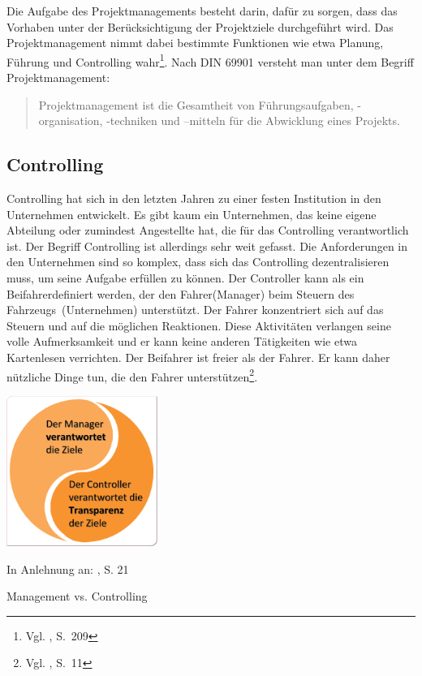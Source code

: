 Die Aufgabe des Projektmanagements besteht darin, dafür zu sorgen, dass das Vorhaben unter der Berücksichtigung der Projektziele durchgeführt wird. Das Projektmanagement nimmt dabei bestimmte Funktionen wie etwa Planung, Führung und Controlling wahr\footnote{Vgl. \cite{Bergmann&Garrecht2008}, S.~209}. Nach DIN 69901 versteht man unter dem Begriff  Projektmanagement: \label{69901Projektmgmt}\begin{quote}Projektmanagement ist die Gesamtheit von Führungsaufgaben, -organisation, -techniken und –mitteln für die Abwicklung eines Projekts.\end{quote}\par 

\subsection{Controlling}
\label{ssec:c}
Controlling hat sich in den letzten Jahren zu einer festen Institution in den Unternehmen entwickelt. Es gibt kaum ein Unternehmen, das keine eigene Abteilung oder zumindest Angestellte hat, die für das Controlling verantwortlich ist. Der Begriff Controlling ist allerdings sehr weit gefasst. Die Anforderungen in den Unternehmen sind so komplex, dass sich das Controlling dezentralisieren muss, um seine Aufgabe erfüllen zu können. Der Controller kann als ein \glqq Beifahrer\grqq  definiert werden, der den \glqq Fahrer\grqq (Manager) beim Steuern des \glqq Fahrzeugs\grqq \ (Unternehmen) unterstützt. Der Fahrer konzentriert sich auf das Steuern und auf die möglichen Reaktionen. Diese Aktivitäten verlangen seine volle Aufmerksamkeit und er kann keine anderen Tätigkeiten wie etwa Kartenlesen verrichten. Der Beifahrer ist freier als der Fahrer. Er kann daher nützliche Dinge tun, die den Fahrer unterstützen\footnote{Vgl. \cite{Pufahl2006}, S.~11}.\newpage
\begin{floatingfigure}[r]{0.37\textwidth} 
\includegraphics[width=0.37\textwidth]{Images/aufgabenabgrenzungLeiterController.png}
\begin{center}
   {\footnotesize In Anlehnung an: \cite{Fiedler2008}, S. 21}
   \caption[Management vs. Controlling]{Management vs. Controlling}\label{abb4}
\end{center}

\end{floatingfigure}\noindent

